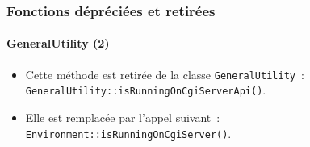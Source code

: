 
\begin{frame}[fragile]
	\frametitle{Fonctions dépréciées et retirées}
	\framesubtitle{GeneralUtility (2)}

	\begin{itemize}
		\item Cette méthode est retirée de la classe \texttt{GeneralUtility}~:
			\texttt{GeneralUtility::isRunningOnCgiServerApi()}.
		\item Elle est remplacée par l'appel suivant~:\newline
			\texttt{Environment::isRunningOnCgiServer()}.

	\end{itemize}

\end{frame}


